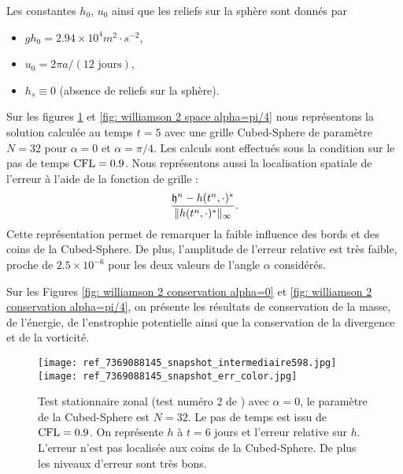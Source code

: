 Les constantes $h_0$, $u_0$ ainsi que les reliefs sur la sphère sont donnés par 
\begin{itemize}
\item $g h_0= 2.94 \times 10^4 m^2 \cdot \si{s^{-2}}$,
\item $u_0= 2 \pi a / (12 \text{ jours})$,
\item $h_s \equiv 0$ (absence de reliefs sur la sphère).
\end{itemize}

Sur les figures \ref{fig: williamson 2 space alpha=0} et \ref{fig: williamson 2 space alpha=pi/4} nous représentons la solution calculée au temps $t=5$ avec une grille Cubed-Sphere de paramètre $N=32$ pour $\alpha= 0$ et $\alpha= \pi/4$. Les calculs sont effectués sous la condition sur le pas de temps $\text{CFL}=0.9$. Nous représentons aussi la localisation spatiale de l'erreur à l'aide de la fonction de grille :
\begin{equation}
\dfrac{\mathfrak{h}^n - h(t^n, \cdot)^*}{\| h(t^n, \cdot)^* \|_{\infty}}.
\end{equation}
Cette représentation permet de remarquer la faible influence des bords et des coins de la Cubed-Sphere. De plus, l'amplitude de l'erreur relative est très faible, proche de $2.5 \times 10^{-6}$ pour les deux valeurs de l'angle $\alpha$ considérés.
 
Sur les Figures \ref{fig: williamson 2 conservation alpha=0} et \ref{fig: williamson 2 conservation alpha=pi/4}, on présente les résultats de conservation de la masse, de l'énergie, de l'enstrophie potentielle ainsi que la conservation de la divergence et de la vorticité.

\begin{figure}[htbp]
\begin{center}
\texttt{[image: ref\_7369088145\_snapshot\_intermediaire598.jpg]}\\
\texttt{[image: ref\_7369088145\_snapshot\_err\_color.jpg]}
\end{center}
\caption{Test stationnaire zonal (test numéro 2 de \cite{Williamson1992}) avec $\alpha=0$, le paramètre de la Cubed-Sphere est $N=32$. Le pas de temps est issu de $\text{CFL}=0.9$. On représente $h$ à $t=6$ jours et l'erreur relative sur $h$. L'erreur n'est pas localisée aux coins de la Cubed-Sphere. De plus les niveaux d'erreur sont très bons.}
\label{fig: williamson 2 space alpha=0}
\end{figure}

